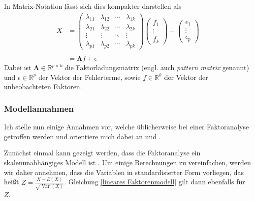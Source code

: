 \documentclass[11pt]{scrartcl}
\DeclareMathOperator{\Var}{Var}
\begin{document}
	In Matrix-Notation lässt sich dies kompakter darstellen als
	\begin{equation} \label{lineares Faktorenmodell}
		\begin{split}
			X &= \begin{pmatrix} 
				\lambda_{11} & \lambda_{12} & \cdots & \lambda_{1k} \\
				\lambda_{21} & \lambda_{22} & \cdots & \lambda_{2k} \\
				\vdots  & \vdots  & \ddots & \vdots  \\
				\lambda_{p1} & \lambda_{p2} & \cdots & \lambda_{pk} 
			\end{pmatrix} 
			\begin{pmatrix}f_1 \\ \vdots \\ f_k\end{pmatrix}
			+ \begin{pmatrix}\epsilon_1 \\ \vdots \\ \epsilon_p\end{pmatrix} \\ \\
			&= \mathbf{\Lambda}f + \epsilon
		\end{split}
	\end{equation}
	Dabei ist $\mathbf{\Lambda}\in \mathbb{R}^{p \times k}$ die Faktorladungsmatrix
	(engl. auch \textit{pattern matrix} genannt) und $\epsilon \in \mathbb{R}^p$
	der Vektor der Fehlerterme, sowie $f \in \mathbb{R}^k$ der Vektor der
	unbeobachteten Faktoren.
	
	\subsubsection{Modellannahmen} \label{Modellannahmen}
	
	Ich stelle nun einige Annahmen vor, welche üblicherweise
	bei einer Faktoranalyse getroffen werden und orientiere mich dabei
	an \textcite[137]{Everitt.2011} und \textcite[410-411]{Rencher.2002}.
	
	Zunächst einmal kann gezeigt werden, dass die Faktoranalyse ein
	skalenunabhängiges Modell ist \parencite[138-139]{Everitt.2011}.
	Um einige Berechnungen zu vereinfachen, werden wir daher 
	annehmen, dass die Variablen in
	standardisierter Form vorliegen, das heißt $Z = \frac{X - E(X)}{\sqrt{\Var(X)}}$.
	Gleichung \ref{lineares Faktorenmodell} gilt dann ebenfalls für $Z$.
	
\end{document}
